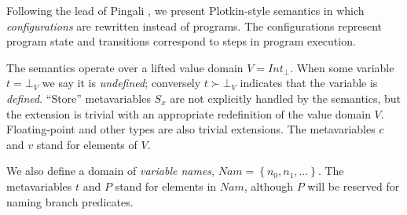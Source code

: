 \documentclass[12pt,notitlepage,twoside]{article}
\newcommand{\set}[1]{\ensuremath{\left\{#1\right\}}}
\begin{document}
Following the lead of Pingali \cite{pingali90:dfg}, we present Plotkin-style
semantics \cite{plotkin81:opsem} in which \emph{configurations} are
rewritten instead of programs.  The configurations represent program
state and transitions correspond to steps in program execution.

The semantics operate over a lifted value domain
$V=\mathit{Int}_\bot$. When some variable $t = \bot_V$ we say it is
\emph{undefined}; conversely $t\succ\bot_V$ indicates that the
variable is \emph{defined}.  ``Store'' metavariables $S_x$ are not
explicitly handled by the semantics, but the extension is trivial with
an appropriate redefinition of the value domain $V$.  Floating-point
and other types are also trivial extensions.  The
metavariables $c$ and $v$ stand for elements of $V$.

We also define a domain of \emph{variable names},
$\mathit{Nam}=\set{n_0,n_1,\ldots}$.  The metavariables $t$ and $P$ stand for
elements in $\mathit{Nam}$, although $P$ will be reserved for naming branch predicates.
\end{document}
